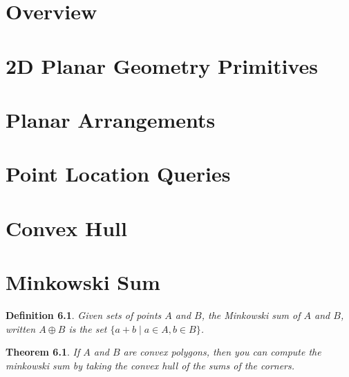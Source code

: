 
\newtheorem{definition}{Definition}
\newtheorem{theorem}{Theorem}
\newtheorem{lemma}{Lemma}
\newtheorem{corollary}{Corollary}
\newtheorem{proposition}{Proposition}

\chapter{Overview}

\chapter{2D Planar Geometry Primitives}

\chapter{Planar Arrangements}
\label{chap:arrangements}


\chapter{Point Location Queries}

\chapter{Convex Hull}

\chapter{Minkowski Sum}

\begin{definition}
  \label{def:minkowski}
  Given sets of points $A$ and $B$, the Minkowski sum of $A$ and $B$, written
  $A ⊕ B$ is the set $\{a + b \mid a ∈ A, b ∈ B\}$.
\end{definition}

\begin{theorem}
  \label{thm:minkowski_convex_poly}
  \notready
  If $A$ and $B$ are convex polygons, then you can compute the minkowski sum by
  taking the convex hull of the sums of the corners.
\end{theorem}


